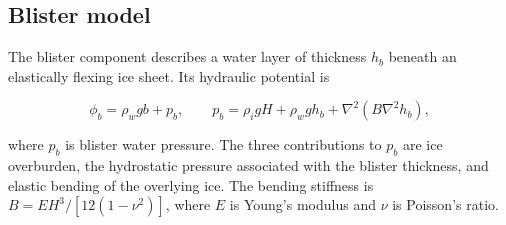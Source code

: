 \documentclass[draft]{agujournal2019}
\begin{document}
\subsection{Blister model}\label{sec:method_blister}
The blister component describes a water layer of thickness $h_b$ beneath an elastically flexing ice sheet. Its hydraulic potential is
\begin{linenomath*}
\begin{equation}\label{eq:hydraulic_potential_blister}
    \phi_b = \rho_w g b + p_b,
    \qquad
    p_b = \rho_i g H + \rho_w g h_b
    + \nabla^2 \left(B\nabla^2 h_b\right),
\end{equation}
\end{linenomath*}
where $p_b$ is blister water pressure. The three contributions to $p_b$ are ice overburden, the hydrostatic pressure associated with the blister thickness, and elastic bending of the overlying ice. The bending stiffness is $B=E H^3/[12(1-\nu^2)]$, where $E$ is Young's modulus and $\nu$ is Poisson's ratio.
\end{document}
